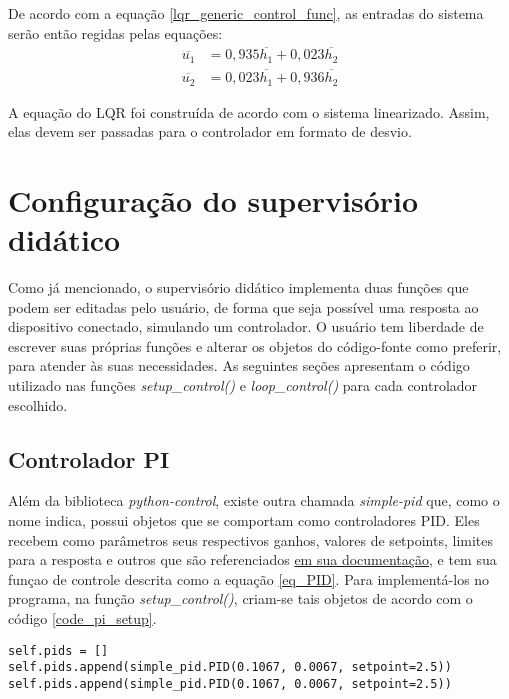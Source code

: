 De acordo com a equação \ref{lqr_generic_control_func}, as entradas do sistema serão então regidas pelas equações:
\begin{align}
\overline{u_1} &= 0,935 \overline{h_1} + 0,023 \overline{h_2} \\
\overline{u_2} &= 0,023 \overline{h_1} + 0,936 \overline{h_2}
\label{lqr_control_function}
\end{align}

A equação do LQR foi construída de acordo com o sistema linearizado. Assim, elas devem ser passadas para o controlador em formato de desvio.

\section{Configuração do supervisório didático}

Como já mencionado, o supervisório didático implementa duas funções que podem ser editadas pelo usuário, de forma que seja possível uma resposta ao dispositivo conectado, simulando um controlador. O usuário tem liberdade de escrever suas próprias funções e alterar os objetos do código-fonte como preferir, para atender às suas necessidades. As seguintes seções apresentam o código utilizado nas funções \emph{setup\_control()} e \emph{loop\_control()} para cada controlador escolhido.

\subsection{Controlador PI}

Além da biblioteca \emph{python-control}, existe outra chamada \emph{simple-pid} que, como o nome indica, possui objetos que se comportam como controladores PID. Eles recebem como parâmetros seus respectivos ganhos, valores de setpoints, limites para a resposta e outros que são referenciados \href{https://pypi.org/project/simple-pid/}{em sua documentação}, e tem sua funçao de controle descrita como a equação \ref{eq_PID}. Para implementá-los no programa, na função \emph{setup\_control()}, criam-se tais objetos de acordo com o código \ref{code_pi_setup}.

\begin{code}
\begin{lstlisting}
self.pids = []
self.pids.append(simple_pid.PID(0.1067, 0.0067, setpoint=2.5))
self.pids.append(simple_pid.PID(0.1067, 0.0067, setpoint=2.5))
\end{lstlisting}
\label{code_pi_setup}
\end{code}

